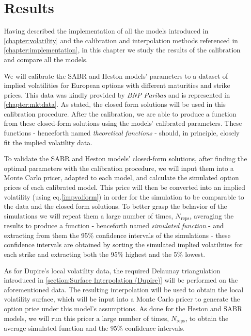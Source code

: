 \chapter{Results}
\label{chapter:results}
Having described the implementation of all the models introduced in \autoref{chapter:volatility} and the calibration and interpolation methods referenced in \autoref{chapter:implementation}, in this chapter we study the results of the calibration and compare all the models.

We will calibrate the SABR and Heston models' parameters to a dataset of implied volatilities for European options with different maturities and strike prices. This data was kindly provided by \emph{BNP Paribas} and is represented in \autoref{chapter:mktdata}. As stated, the closed form solutions will be used in this calibration procedure. After the calibration, we are able to produce a function from these closed-form solutions using the models' calibrated parameters. These functions - henceforth named \emph{theoretical functions} - should, in principle, closely fit the implied volatility data.

To validate the SABR and Heston models' closed-form solutions, after finding the optimal parameters with the calibration procedure, we will input them into a Monte Carlo pricer, adapted to each model, and calculate the simulated option prices of each calibrated model. This price will then be converted into an implied volatility (using eq.\eqref{impvolform}) in order for the simulation to be comparable to the data and the closed form solutions. To better grasp the behavior of the simulations we will repeat them a large number of times, $N_{\mathrm{reps}}$, averaging the results to produce a function - henceforth named \emph{simulated function} -  and extracting from them the 95\% confidence intervals of the simulations - these confidence intervals are obtained by sorting the simulated implied volatilities for each strike and extracting both the 95\% highest and the 5\% lowest.



As for Dupire's local volatility data, the required Delaunay triangulation introduced in \autoref{section:Surface Interpolation (Dupire)} will be performed on the aforementioned data. The resulting interpolation will be used to obtain the local volatility surface, which will be input into a Monte Carlo pricer to generate the option price under this model's assumptions. As done for the Heston and SABR models, we will run this pricer a large number of times, $N_{\mathrm{reps}}$, to obtain the average simulated function and the 95\% confidence intervals.


